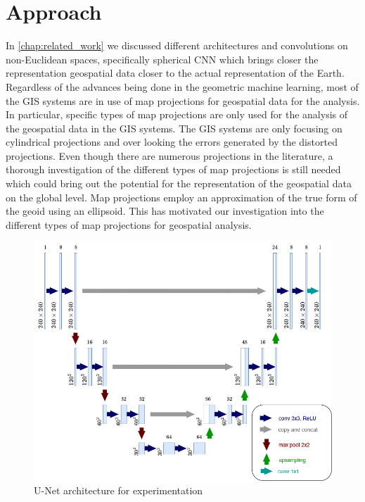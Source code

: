 \clearpage
\cleardoublepage

\chapter{Approach}
\label{chap:approach}
In  \autoref{chap:related_work} we discussed different architectures and convolutions on non-Euclidean spaces, specifically spherical CNN which brings closer the
representation geospatial data closer to the actual representation of the Earth. Regardless of the advances being done in the geometric machine learning,
most of the GIS systems are in use of map projections for geospatial data for the analysis. In particular, specific types of map projections are only used for
the analysis of the geospatial data in the GIS systems. The GIS systems are only focusing on cylindrical projections and over looking the errors generated by
the distorted projections. Even though there are numerous projections in the literature, a thorough investigation of the different types of map projections is still
needed which could bring out the potential for the representation of the geospatial data on the global level. Map projections employ an approximation of the true form
of the geoid using an ellipsoid. This has motivated our investigation into the different types of map projections for geospatial analysis.

\begin{figure}[h]
    \centering
    \includegraphics[width=1.0\linewidth]{figures/chapter-5/my_unet.png}
    \caption{U-Net architecture for experimentation }
    \label{fig:self-unet}
\end{figure}

